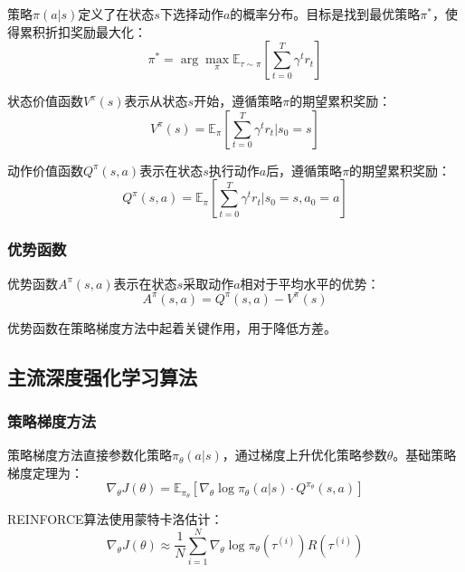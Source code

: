\documentclass[12pt,a4paper]{ctexart}
\begin{document}
策略$\pi(a|s)$定义了在状态$s$下选择动作$a$的概率分布。目标是找到最优策略$\pi^*$，使得累积折扣奖励最大化：
\begin{equation}
    \pi^* = \arg\max_{\pi} \mathbb{E}_{\tau \sim \pi}\left[\sum_{t=0}^{T} \gamma^t r_t\right]
\end{equation}

状态价值函数$V^{\pi}(s)$表示从状态$s$开始，遵循策略$\pi$的期望累积奖励：
\begin{equation}
    V^{\pi}(s) = \mathbb{E}_{\pi}\left[\sum_{t=0}^{T} \gamma^t r_t \big| s_0 = s\right]
\end{equation}

动作价值函数$Q^{\pi}(s,a)$表示在状态$s$执行动作$a$后，遵循策略$\pi$的期望累积奖励：
\begin{equation}
    Q^{\pi}(s,a) = \mathbb{E}_{\pi}\left[\sum_{t=0}^{T} \gamma^t r_t \big| s_0 = s, a_0 = a\right]
\end{equation}

\subsubsection{优势函数}

优势函数$A^{\pi}(s,a)$表示在状态$s$采取动作$a$相对于平均水平的优势：
\begin{equation}
    A^{\pi}(s,a) = Q^{\pi}(s,a) - V^{\pi}(s)
\end{equation}

优势函数在策略梯度方法中起着关键作用，用于降低方差。

\subsection{主流深度强化学习算法}

\subsubsection{策略梯度方法}

策略梯度方法直接参数化策略$\pi_{\theta}(a|s)$，通过梯度上升优化策略参数$\theta$。基础策略梯度定理为：
\begin{equation}
    \nabla_{\theta} J(\theta) = \mathbb{E}_{\pi_{\theta}}\left[\nabla_{\theta} \log \pi_{\theta}(a|s) \cdot Q^{\pi_{\theta}}(s,a)\right]
\end{equation}

REINFORCE算法使用蒙特卡洛估计：
\begin{equation}
    \nabla_{\theta} J(\theta) \approx \frac{1}{N} \sum_{i=1}^{N} \nabla_{\theta} \log \pi_{\theta}(\tau^{(i)}) R(\tau^{(i)})
\end{equation}
\end{document}
